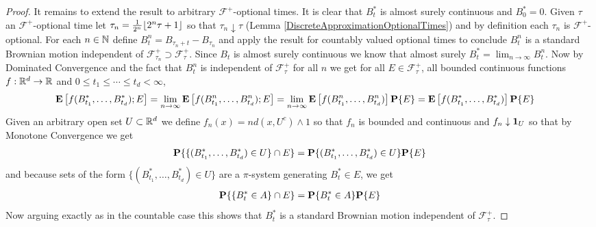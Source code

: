 \begin{proof}
It remains to extend the result to arbitrary $\mathcal{F}^+$-optional times.  It is clear that $B^*_t$ is
almost surely continuous and $B^*_0 = 0$.  Given
$\tau$ an $\mathcal{F}^+$-optional time let $\tau_n = \frac{1}{2^n}
\lfloor 2^n \tau + 1 \rfloor$ so that $\tau_n \downarrow \tau$ (Lemma
\ref{DiscreteApproximationOptionalTimes}) and by definition each
$\tau_n$ is $\mathcal{F}^+$-optional.  For each $n \in \mathbb{N}$ define $B^n_t = B_{\tau_n + t} -
B_{\tau_n}$ and apply the result for countably valued optional times
to conclude $B^n_t$ is a standard Brownian motion independent of
$\mathcal{F}^+_{\tau_n} \supset \mathcal{F}^+_{\tau} $.  Since $B_t$ is almost surely
continuous we know that almost surely $B^*_t = \lim_{n \to \infty}
B^n_t$.  Now by Dominated Convergence and the fact that $B^n_t$ is
independent of $\mathcal{F}^+_{\tau}$ for all $n$ we get for all $E
\in \mathcal{F}^+_{\tau}$, all
bounded continuous functions $f : \mathbb{R}^d \to \mathbb{R}$ and $0 \leq t_1 \leq
\dotsb \leq t_d < \infty$,
\begin{align*}
\textbf{E}\left[f(B^*_{t_1}, \dotsc, B^*_{t_d}) ; E\right] &= 
\lim_{n \to  \infty} \textbf{E}\left[f(B^n_{t_1}, \dotsc, B^n_{t_d}) ; E\right]
= \lim_{n \to  \infty} \textbf{E}\left[f(B^n_{t_1}, \dotsc, B^n_{t_d})\right] \textbf{P}\{E\}
=\textbf{E}\left[f(B^*_{t_1}, \dotsc, B^*_{t_d})\right] \textbf{P}\{E\} 
\end{align*}
Given an arbitrary open set $U \subset \mathbb{R}^d$ we define $f_n(x) = n
d(x, U^c) \wedge 1$ so that $f_n$ is bounded and continuous and $f_n
\downarrow \textbf{1}_{U}$ so that by Monotone Convergence we get
\begin{align*}
\textbf{P}\{ \lbrace (B^*_{t_1}, \dotsc, B^*_{t_d}) \in U \rbrace
  \cap E\} = \textbf{P}\{ (B^*_{t_1}, \dotsc, B^*_{t_d}) \in U \} \textbf{P}\{E\}
\end{align*}
and because sets of the form $\lbrace (B^*_{t_1}, \dotsc, B^*_{t_d})
\in U \rbrace$ are a $\pi$-system generating $B^*_t \in E$, we get 
\begin{align*}
\textbf{P}\{ \lbrace B^*_t \in A \rbrace
  \cap E\} = \textbf{P}\{ B^*_t \in A \} \textbf{P}\{E\}
\end{align*}
Now arguing exactly as in the countable case this shows that $B^*_t$
is a standard Brownian motion independent of $\mathcal{F}^+_\tau$.
\end{proof}

